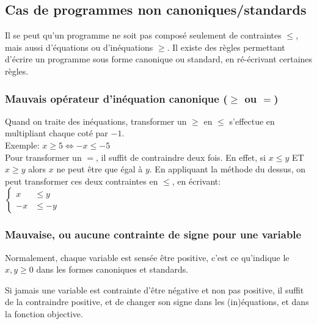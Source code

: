 \documentclass[a4paper, 11pt]{article}
\begin{document}
\subsection{Cas de programmes non canoniques/standards}

Il se peut qu'un programme ne soit pas composé seulement de contraintes $\le$, mais aussi d'équations ou d'inéquations $\ge$.
Il existe des règles permettant d'écrire un programme sous forme canonique ou standard, en ré-écrivant certaines règles.

\subsubsection{Mauvais opérateur d'inéquation canonique ($\ge$ ou $=$)}

Quand on traite des inéquations, transformer un $\ge$ en $\le$ s'effectue en multipliant chaque coté par $-1$. \\
Exemple: $x \ge 5 \Leftrightarrow -x \le -5$ \\

Pour transformer un $=$, il suffit de contraindre deux fois. En effet, si $x \le y$ ET $x \ge y$ alors $x$ ne peut être que égal à $y$. En appliquant la méthode du dessus, on peut transformer ces deux contraintes en $\le$, en écrivant:\\

$
\begin{cases}
	x &\le y \\ -x &\le -y
\end{cases}
$

\newpage
\subsubsection{Mauvaise, ou aucune contrainte de signe pour une variable}

Normalement, chaque variable est sensée être positive, c'est ce qu'indique le $x,y \ge 0$ dans les formes canoniques et standards.

Si jamais une variable est contrainte d'être négative et non pas positive, il suffit de la contraindre positive, et de changer son signe dans les (in)équations, et dans la fonction objective. \\
\end{document}
